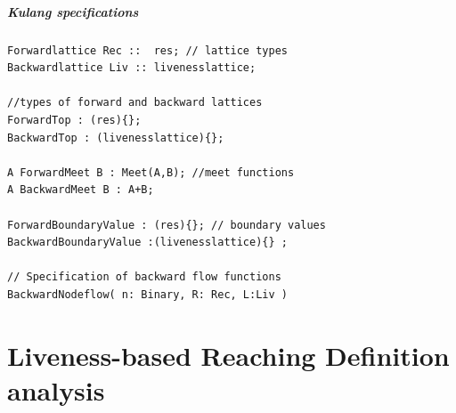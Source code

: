 \documentclass[xcolor=dvipsnames]{beamer}
\begin{document}
\begin{frame}[fragile]
  \frametitle{Kulang specifications}
  \begin{verbatim}
Forwardlattice Rec ::  res; // lattice types
Backwardlattice Liv :: livenesslattice;

//types of forward and backward lattices
ForwardTop : (res){};
BackwardTop : (livenesslattice){};

A ForwardMeet B : Meet(A,B); //meet functions
A BackwardMeet B : A+B;

ForwardBoundaryValue : (res){}; // boundary values
BackwardBoundaryValue :(livenesslattice){} ;

// Specification of backward flow functions 
BackwardNodeflow( n: Binary, R: Rec, L:Liv )

  \end{verbatim}
\end{frame}



\part{Liveness-based Reaching Definition analysis}
\frame{\partpage}


\end{document}

